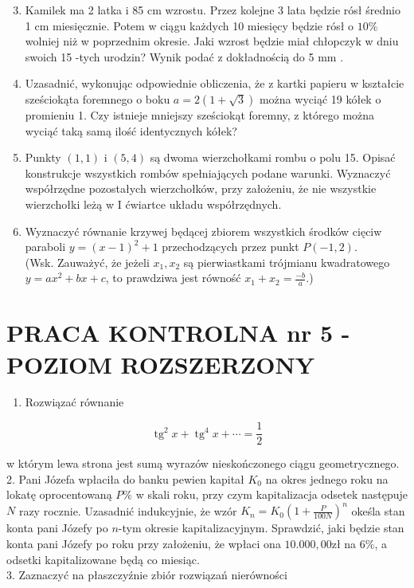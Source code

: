 \documentclass[10pt]{article}
\begin{document}
\begin{enumerate}
  \setcounter{enumi}{2}
  \item Kamilek ma 2 latka i 85 cm wzrostu. Przez kolejne 3 lata będzie rósł średnio 1 cm miesięcznie. Potem w ciągu każdych 10 miesięcy będzie rósł o $10 \%$ wolniej niż w poprzednim okresie. Jaki wzrost będzie miał chłopczyk w dniu swoich 15 -tych urodzin? Wynik podać z dokładnością do 5 mm .
  \item Uzasadnić, wykonując odpowiednie obliczenia, że z kartki papieru w kształcie sześciokąta foremnego o boku $a=2(1+\sqrt{3})$ można wyciąć 19 kółek o promieniu 1. Czy istnieje mniejszy sześciokąt foremny, z którego można wyciąć taką samą ilość identycznych kółek?
  \item Punkty $(1,1)$ i $(5,4)$ są dwoma wierzchołkami rombu o polu 15. Opisać konstrukcje wszystkich rombów spełniających podane warunki. Wyznaczyć współrzędne pozostałych wierzchołków, przy założeniu, że nie wszystkie wierzchołki leżą w I ćwiartce układu współrzędnych.
  \item Wyznaczyć równanie krzywej będącej zbiorem wszystkich środków cięciw paraboli $y=(x-1)^{2}+1$ przechodzących przez punkt $P(-1,2)$.\\
(Wsk. Zauważyć, że jeżeli $x_{1}, x_{2}$ są pierwiastkami trójmianu kwadratowego $y=a x^{2}+b x+c$, to prawdziwa jest równość $x_{1}+x_{2}=\frac{-b}{a}$.)
\end{enumerate}

\section*{PRACA KONTROLNA nr 5 - POZIOM ROZSZERZONY}
\begin{enumerate}
  \item Rozwiązać równanie
\end{enumerate}

$$
\operatorname{tg}^{2} x+\operatorname{tg}^{4} x+\cdots=\frac{1}{2}
$$

w którym lewa strona jest sumą wyrazów nieskończonego ciągu geometrycznego.\\
2. Pani Józefa wpłaciła do banku pewien kapitał $K_{0}$ na okres jednego roku na lokatę oprocentowaną $P \%$ w skali roku, przy czym kapitalizacja odsetek następuje $N$ razy rocznie. Uzasadnić indukcyjnie, że wzór $K_{n}=K_{0}\left(1+\frac{P}{100 N}\right)^{n}$ okeśla stan konta pani Józefy po $n$-tym okresie kapitalizacyjnym. Sprawdzić, jaki będzie stan konta pani Józefy po roku przy założeniu, że wpłaci ona $10.000,00 \mathrm{zł}$ na $6 \%$, a odsetki kapitalizowane będą co miesiąc.\\
3. Zaznaczyć na płaszczyźnie zbiór rozwiązań nierówności
\end{document}
